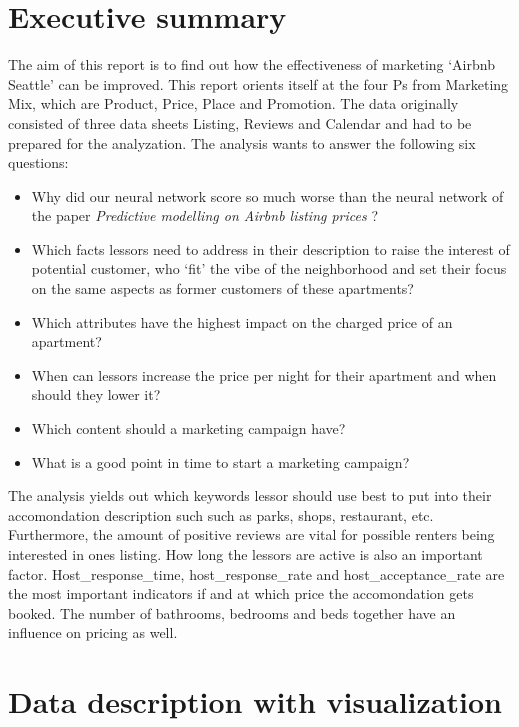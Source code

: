 \documentclass[journal]{IEEEtran}
\begin{document}
\section{Executive summary} 
\noindent The aim of this report is to find out how the effectiveness of marketing ‘Airbnb Seattle’ can be improved. This report orients itself at the four Ps from Marketing Mix, which are Product, Price, Place and Promotion. 
The data originally consisted of three data sheets Listing, Reviews and Calendar and had to be prepared for the analyzation. 
The analysis wants to answer the following six questions: 
\begin{itemize}
\item Why did our neural network score so much worse than the neural network of the paper \textit{Predictive modelling on Airbnb listing prices} \cite{RN1} ?
\item Which facts lessors need to address in their description to raise the interest of potential customer, who ‘fit’ the vibe of the neighborhood and set their focus on the same aspects as former customers of these apartments?
\item Which attributes have the highest impact on the charged price of an apartment?
\item When can lessors increase the price per night for their apartment and when should they lower it?
\item Which content should a marketing campaign have?
\item What is a good point in time to start a marketing campaign?
\end{itemize}
The analysis yields out  which keywords lessor should use best to put into their accomondation description such such as parks, shops, restaurant, etc.
Furthermore, the amount of positive reviews are vital for possible renters being interested in ones listing. How long the lessors are active is also an important factor. 
Host\_response\_time, host\_response\_rate and host\_acceptance\_rate are the most important indicators if and at which price the accomondation gets booked. The number of bathrooms, bedrooms and beds together have an influence on pricing as well. 
%
%
\section{Data description with visualization}
\end{document}
